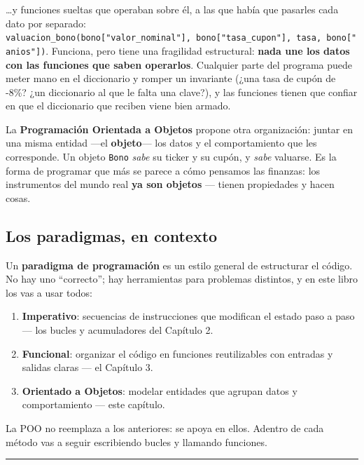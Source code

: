 \documentclass[
  spanish,
  letterpaper,
  DIV=11,
  numbers=noendperiod]{scrreprt}
\providecommand{\tightlist}{%
  \setlength{\itemsep}{0pt}\setlength{\parskip}{0pt}}
\begin{document}
\ldots y funciones sueltas que operaban sobre él, a las que había que
pasarles cada dato por separado:
\texttt{valuacion\_bono(bono{[}"valor\_nominal"{]},\ bono{[}"tasa\_cupon"{]},\ tasa,\ bono{[}"anios"{]})}.
Funciona, pero tiene una fragilidad estructural: \textbf{nada une los
datos con las funciones que saben operarlos}. Cualquier parte del
programa puede meter mano en el diccionario y romper un invariante (¿una
tasa de cupón de -8\%? ¿un diccionario al que le falta una clave?), y
las funciones tienen que confiar en que el diccionario que reciben viene
bien armado.

La \textbf{Programación Orientada a Objetos} propone otra organización:
juntar en una misma entidad ---el \textbf{objeto}--- los datos y el
comportamiento que les corresponde. Un objeto \texttt{Bono} \emph{sabe}
su ticker y su cupón, y \emph{sabe} valuarse. Es la forma de programar
que más se parece a cómo pensamos las finanzas: los instrumentos del
mundo real \textbf{ya son objetos} --- tienen propiedades y hacen cosas.

\subsection*{Los paradigmas, en
contexto}\label{los-paradigmas-en-contexto}

Un \textbf{paradigma de programación} es un estilo general de
estructurar el código. No hay uno ``correcto''; hay herramientas para
problemas distintos, y en este libro los vas a usar todos:

\begin{enumerate}
\def\labelenumi{\arabic{enumi}.}
\tightlist
\item
  \textbf{Imperativo}: secuencias de instrucciones que modifican el
  estado paso a paso --- los bucles y acumuladores del Capítulo 2.
\item
  \textbf{Funcional}: organizar el código en funciones reutilizables con
  entradas y salidas claras --- el Capítulo 3.
\item
  \textbf{Orientado a Objetos}: modelar entidades que agrupan datos y
  comportamiento --- este capítulo.
\end{enumerate}

La POO no reemplaza a los anteriores: se apoya en ellos. Adentro de cada
método vas a seguir escribiendo bucles y llamando funciones.

\begin{center}\rule{0.5\linewidth}{0.5pt}\end{center}
\end{document}

